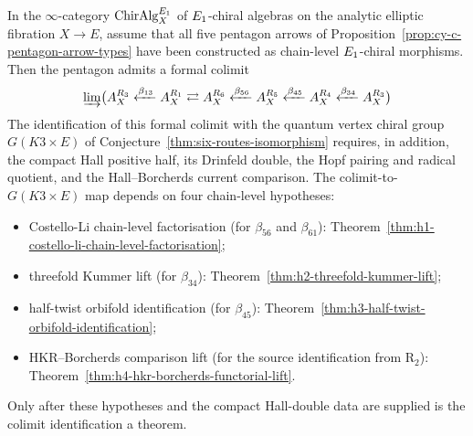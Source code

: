 \begin{proposition}
\label{prop:cy-c-pentagon-colimit}
In the $\infty$-category $\mathrm{ChirAlg}^{E_{1}}_X$ of $E_{1}$-chiral algebras on the analytic elliptic
fibration $X \to E$, assume that all five pentagon arrows of Proposition~\ref{prop:cy-c-pentagon-arrow-types}
have been constructed as chain-level $E_{1}$-chiral morphisms. Then the pentagon admits a formal colimit
\[
 \varinjlim \bigl( A_X^{R_3} \xleftarrow{\beta_{13}} A_X^{R_1} \rightleftarrows A_X^{R_6} \xleftarrow{\beta_{56}} A_X^{R_5} \xleftarrow{\beta_{45}} A_X^{R_4} \xleftarrow{\beta_{34}} A_X^{R_3} \bigr)
\]
The identification of this formal colimit with the quantum vertex chiral group $G(K3 \times E)$ of
Conjecture~\ref{thm:six-routes-isomorphism} requires, in addition, the compact Hall positive half, its
Drinfeld double, the Hopf pairing and radical quotient, and the Hall--Borcherds current comparison. The
colimit-to-$G(K3\times E)$ map depends on four chain-level hypotheses:
\begin{itemize}
 \item Costello-Li chain-level factorisation (for $\beta_{56}$ and $\beta_{61}$):
 Theorem~\ref{thm:h1-costello-li-chain-level-factorisation};
 \item threefold Kummer lift (for $\beta_{34}$):
 Theorem~\ref{thm:h2-threefold-kummer-lift};
 \item half-twist orbifold identification (for $\beta_{45}$):
 Theorem~\ref{thm:h3-half-twist-orbifold-identification};
 \item HKR--Borcherds comparison lift (for the source identification from R$_2$):
 Theorem~\ref{thm:h4-hkr-borcherds-functorial-lift}.
\end{itemize}
Only after these hypotheses and the compact Hall-double data are supplied is the colimit identification a
theorem.
\end{proposition}

